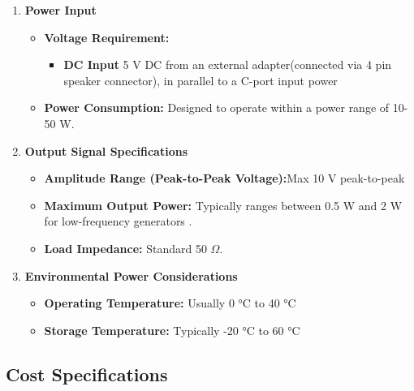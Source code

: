 \documentclass[12pt,a4paper]{article}
\begin{document}
\begin{enumerate}
    \item \textbf{Power Input}
    \begin{itemize}
        \item \textbf{Voltage Requirement:}
        \begin{itemize}
            \item \textbf{DC Input} 5 V DC from an external adapter(connected via 4 pin speaker connector), in parallel to a C-port input power
        \end{itemize}
        \item \textbf{Power Consumption:} Designed to operate within a power range of 10-50 W. 
    \end{itemize}

    \item \textbf{Output Signal Specifications}
    \begin{itemize}
        \item \textbf{Amplitude Range (Peak-to-Peak Voltage):}Max 10 V peak-to-peak 
        \item \textbf{Maximum Output Power:} Typically ranges between 0.5 W and 2 W for low-frequency generators .
        \item \textbf{Load Impedance:} Standard 50  $\Omega$.
    \end{itemize}

    \item \textbf{Environmental Power Considerations}
    \begin{itemize}
        \item \textbf{Operating Temperature:} Usually 0 °C to 40 °C
        \item \textbf{Storage Temperature:} Typically -20 °C to 60 °C
    \end{itemize}
\end{enumerate}

\subsection{Cost Specifications}
\end{document}
